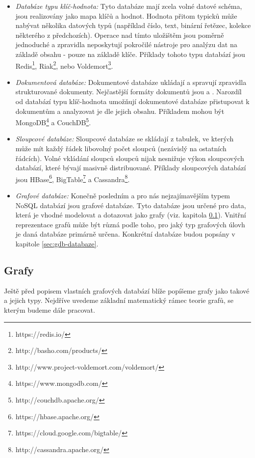 \begin{itemize}
  \item{\textit{Databáze typu klíč-hodnota:}} Tyto databáze mají zcela volné datové schéma, jsou realizovány jako mapa klíčů a hodnot. Hodnota přitom typicků může nabývat několika datových typů (například číslo, text, binární řetězec, kolekce některého z předchozích). Operace nad tímto uložištěm jsou poměrně jednoduché a zpravidla neposkytují pokročilé nástroje pro analýzu dat na základě obsahu - pouze na základě klíče. Příklady tohoto typu databází jsou Redis\footnote{https://redis.io/}, Riak\footnote{http://basho.com/products/}, nebo Voldemort\footnote{http://www.project-voldemort.com/voldemort/}.
  \item{\textit{Dokumentová databáze:}} Dokumentové databáze ukládají a spravují zpravidla strukturované dokumenty. Nejčastější formáty dokumentů jsou \textit{} a \textit{}. Narozdíl od databází typu klíč-hodnota umožňují dokumentové databáze přistupovat k dokumentům a analyzovat je dle jejich obsahu. Příkladem mohou být MongoDB\footnote{https://www.mongodb.com/} a CouchDB\footnote{http://couchdb.apache.org/}.  
  \item{\textit{Sloupcové databáze:}} Sloupcové databáze se skládají z tabulek, ve kterých může mít každý řádek libovolný počet sloupců (nezávislý na ostatních řádcích). Volné vkládání sloupců sloupců nijak nesnižuje výkon sloupcových databází, které bývají masivně distribuované. Příklady sloupcových databází jsou HBase\footnote{https://hbase.apache.org/}, BigTable\footnote{https://cloud.google.com/bigtable/} a Cassandra\footnote{http://cassandra.apache.org/}.
  \item{\textit{Grafové databáze:}} Konečně posledním a pro nás nejzajímavějším typem NoSQL databází jsou grafové databáze. Tyto databáze jsou určené pro data, která je vhodné modelovat a dotazovat jako grafy (viz. kapitola \ref{sec:gdb-grafy}). Vnitřní reprezentace grafů může být různá podle toho, pro jaký typ grafových úlovh je daná databáze primárně určena. Konkrétní databáze budou popsány v kapitole \ref{sec:gdb-databaze}.
\end{itemize}


\subsection{Grafy}
\label{sec:gdb-grafy}
Ještě před popisem vlastních grafových databází blíže popíšeme grafy jako takové a jejich typy. Nejdříve uvedeme základní matematický rámec teorie grafů, se kterým budeme dále pracovat. 

